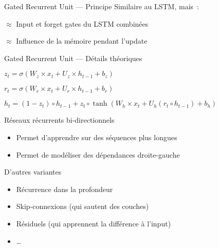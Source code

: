 \begin{frame}{Gated Recurrent Unit --- Principe}
  Similaire au LSTM, mais~:
  \begin{description}[<+->]
    \item[Update gate] $\approx$ Input et forget gates du LSTM combinées
    \item[Reset gate] $\approx$ Influence de la mémoire pendant l'update
  \end{description}
\end{frame}

\begin{frame}{Gated Recurrent Unit --- Détails théoriques}
  \begin{description}[<+->]
    \item[Update gate] $z_t = \sigma (W_z \times x_t + U_z \times h_{t - 1} + b_z)$
    \item[Reset gate] $r_t = \sigma (W_r \times x_t + U_r \times h_{t - 1} + b_r)$
    \item[Sortie] $h_t = (1 - z_t) \circ h_{t - 1} + z_t \circ \tanh(W_h \times x_t + U_h (r_t \circ h_{t - 1}) + b_h)$
  \end{description}
\end{frame}

\begin{frame}{Réseaux récurrents bi-directionnels}
  \begin{itemize}[<+->]
    \item Permet d'apprendre sur des séquences plus longues
    \item Permet de modéliser des dépendances droite-gauche
  \end{itemize}
\end{frame}

\begin{frame}{D'autres variantes}
  \begin{itemize}[<+->]
    \item Récurrence dans la profondeur
    \item Skip-connexions (qui sautent des couches)
    \item Résiduels (qui apprennent la différence à l'input)
    \item …
  \end{itemize}
\end{frame}

